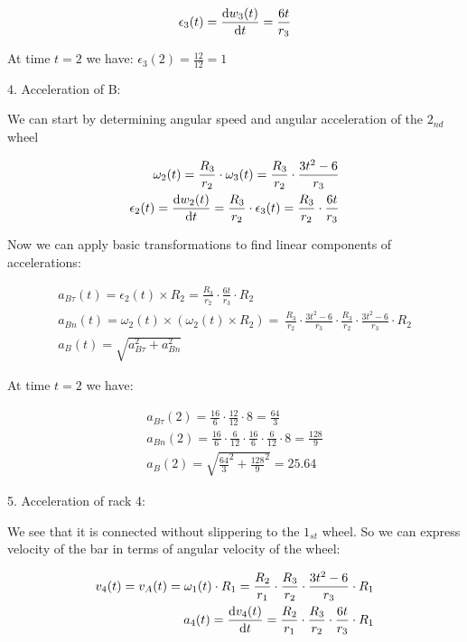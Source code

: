 \documentclass{article}
\begin{document}
\begin{align}
    \epsilon_3(t) = \dv{w_3(t)}{t} = \frac{6t}{r_3}
\end{align}

At time $t = 2$ we have: $\epsilon_3(2) = \frac{12}{12} = 1$

4. Acceleration of B:

We can start by determining angular speed and angular acceleration of the $2_{nd}$ wheel

\begin{align}
    \omega_2(t) = \frac{R_3}{r_2} \cdot \omega_3(t) = \frac{R_3}{r_2} \cdot \frac{3t^2 - 6}{r_3} \\
    \epsilon_2(t) = \dv{w_2(t)}{t} = \frac{R_3}{r_2} \cdot \epsilon_3(t) = \frac{R_3}{r_2} \cdot \frac{6t}{r_3}
\end{align}

Now we can apply basic transformations to find linear components of accelerations:

\begin{align}
    a_{B\tau}(t) = \epsilon_2(t) \times R_2 = \frac{R_3}{r_2} \cdot \frac{6t}{r_3} \cdot R_2              \\
    a_{Bn}(t) = \omega_2(t) \times ( \omega_2(t) \times R_2 ) = \
    \frac{R_3}{r_2} \cdot \frac{3t^2 - 6}{r_3} \cdot \frac{R_3}{r_2} \cdot \frac{3t^2 - 6}{r_3} \cdot R_2 \\
    a_{B}(t) = \sqrt{a_{B\tau}^2 + a_{Bn}^2}
\end{align}

At time $t = 2$ we have:

\begin{align}
    a_{B\tau}(2) = \frac{16}{6} \cdot \frac{12}{12} \cdot 8 = \frac{64}{3}                                    \\
    a_{Bn}(2) = \frac{16}{6} \cdot \frac{6}{12} \cdot \frac{16}{6} \cdot \frac{6}{12} \cdot 8 = \frac{128}{9} \\
    a_{B}(2) = \sqrt{\frac{64}{3}^2 + \frac{128}{9}^2} = 25.64
\end{align}

5. Acceleration of rack 4:

We see that it is connected without slippering to the $1_{st}$ wheel.
So we can express velocity of the bar in terms of angular velocity of the wheel:

\begin{align}
    v_{4}(t) = v_A(t) = \omega_1(t) \cdot R_1 = \frac{R_2}{r_1} \cdot \frac{R_3}{r_2} \cdot \frac{3t^2 - 6}{r_3} \cdot {R_1} \\
    a_{4}(t) = \dv{v_{4}(t)}{t} = \frac{R_2}{r_1} \cdot \frac{R_3}{r_2} \cdot \frac{6t}{r_3} \cdot {R_1}
\end{align}
\end{document}
